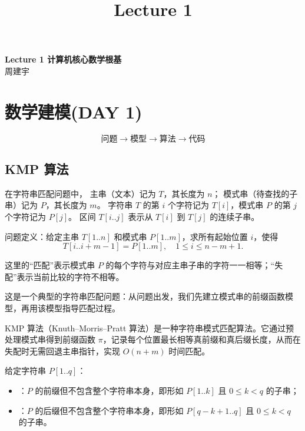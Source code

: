 \documentclass[12pt]{article}
\title{Lecture 1}
\begin{document}
\begin{center}
  {\LARGE \bf Lecture 1 计算机核心数学根基}\\
  {\large 周建宇}
\end{center}


\section{数学建模(DAY 1)}

\[
  \text{问题}\rightarrow \text{模型}\rightarrow \text{算法}\rightarrow \text{代码}
\]
\subsection{KMP 算法}
在字符串匹配问题中，
主串（文本）记为 $T$，其长度为 $n$；
模式串（待查找的子串）记为 $P$，其长度为 $m$。
字符串 $T$ 的第 $i$ 个字符记为 $T[i]$，模式串 $P$ 的第 $j$ 个字符记为 $P[j]$。
区间 $T[i..j]$ 表示从 $T[i]$ 到 $T[j]$ 的连续子串。

问题定义：给定主串 $T[1..n]$ 和模式串 $P[1..m]$，求所有起始位置 $i$，使得
\[
  T[i..i+m-1] = P[1..m],\quad 1 \le i \le n-m+1.
\]

这里的“匹配”表示模式串 $P$ 的每个字符与对应主串子串的字符一一相等；“失配”表示当前比较的字符不相等。

这是一个典型的字符串匹配问题：从问题出发，我们先建立模式串的前缀函数模型，再用该模型指导匹配过程。

\begin{defn}
  KMP 算法（Knuth--Morris--Pratt 算法）是一种字符串模式匹配算法。它通过预处理模式串得到前缀函数 $\pi$，记录每个位置最长相等真前缀和真后缀长度，从而在失配时无需回退主串指针，实现 $O(n+m)$ 时间匹配。
\end{defn}
\begin{defn}[真前缀与真后缀]
  给定字符串 $P[1..q]$：
  \begin{itemize}
    \item {}：$P$ 的前缀但不包含整个字符串本身，即形如 $P[1..k]$ 且 $0 \le k < q$ 的子串；
    \item {}：$P$ 的后缀但不包含整个字符串本身，即形如 $P[q-k+1..q]$ 且 $0 \le k < q$ 的子串。
  \end{itemize}
\end{defn}
\end{document}
